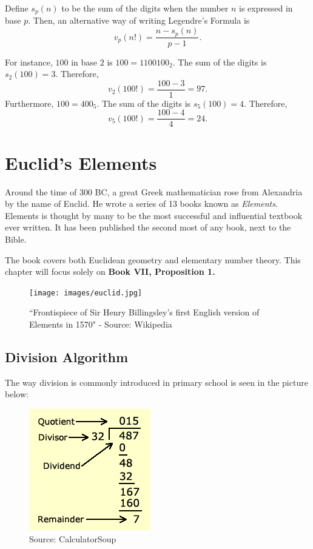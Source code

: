 \clearpage 

Define $s_p(n)$ to be the sum of the digits when the number $n$ is expressed in base $p$. Then, an alternative way of writing Legendre's Formula is $$v_p(n!)=\frac{n-s_p(n)}{p-1}.$$  

For instance, $100$ in base $2$ is $100=1100100_2$. The sum of the digits is $s_2(100)=3$. Therefore, $$v_2(100!)=\frac{100-3}{1}=97.$$ 
Furthermore, $100=400_5$. The sum of the digits is $s_5(100)=4$. Therefore, $$v_5(100!)=\frac{100-4}{4}=24.$$

\clearpage

\section{Euclid's Elements}

Around the time of 300 BC, a great Greek mathematician rose from Alexandria by the name of Euclid. He wrote a series of 13 books known as \textit{Elements}. Elements is thought by many to be the most successful and influential textbook ever written. It has been published the second most of any book, next to the Bible. \cite{wiki:el}

The book covers both Euclidean geometry and elementary number theory. This chapter will focus solely on \textbf{Book VII, Proposition 1.}

\clearpage

\begin{figure}[h]
	\centering\texttt{[image: images/euclid.jpg]}
	\caption{``Frontispiece of Sir Henry Billingsley's first English version of Elements in 1570" - Source:  Wikipedia \cite{wiki:el}}
\end{figure}

\clearpage

\subsection{Division Algorithm} 
The way division is commonly introduced in primary school is seen in the picture below:

\begin{figure}[h]
	\centering\includegraphics[width=0.25\linewidth]{images/divisionparts.png}
	\caption{Source:  CalculatorSoup}
\end{figure}

